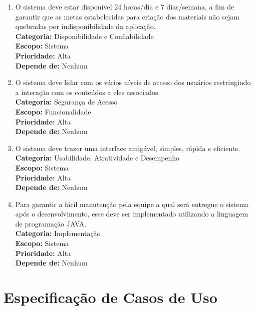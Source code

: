 \begin{enumerate}[label=\textbf{RNF\protect\twodigits{\theenumi}}, leftmargin=2cm]

	\item \label{rf:papeis} O sistema deve estar disponível 24 horas/dia e 7 dias/semana, a fim de garantir que as metas estabelecidas para criação dos materiais não sejam quebradas por indisponibilidade da aplicação. \\
		\textbf{Categoria:} Disponibilidade e Confiabilidade \\
		\textbf{Escopo:} Sistema \\
		\textbf{Prioridade:} Alta \\
		\textbf{Depende de:} Nenhum

	\item \label{rf:papeis} O sistema deve lidar com os vários níveis de acesso dos usuários restringindo a interação com os conteúdos a eles associados. \\
		\textbf{Categoria:} Segurança de Acesso \\
		\textbf{Escopo:} Funcionalidade \\
		\textbf{Prioridade:} Alta \\
		\textbf{Depende de:} Nenhum

	\item \label{rf:papeis} O sistema deve trazer uma interface amigável, simples, rápida e eficiente. \\
		\textbf{Categoria:} Usabilidade, Atratividade e Desempenho \\
		\textbf{Escopo:} Sistema \\
		\textbf{Prioridade:} Alta \\
		\textbf{Depende de:} Nenhum

	\item \label{rf:papeis} Para garantir a fácil manutenção pela equipe a qual será entregue o sistema após o desenvolvimento, esse deve ser implementado utilizando a linguagem de programação JAVA. \\
		\textbf{Categoria:} Implementação \\
		\textbf{Escopo:} Sistema \\
		\textbf{Prioridade:} Alta \\
		\textbf{Depende de:} Nenhum

\end{enumerate}

\section{Especificação de Casos de Uso}

